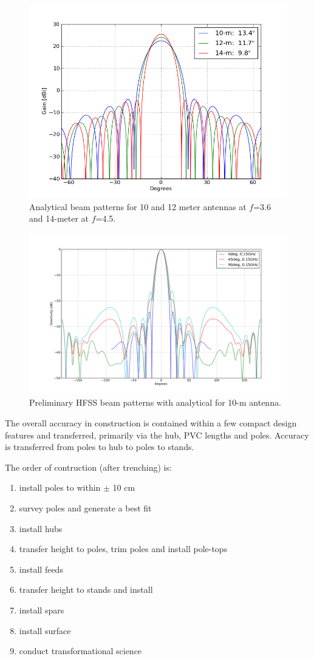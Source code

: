\documentclass[11pt]{article}
\begin{document}
\begin{figure}[H]
\centering
\includegraphics[width=12cm]{hera_10-12-14Beam.png}
\caption{Analytical beam patterns for 10 and 12 meter antennas at $f$=3.6 and 14-meter at $f$=4.5.}
\label{fig:HERA_10-12Beam}
\end{figure}

\begin{figure}[H]
\centering
\includegraphics[width=12cm]{pp.png}
\caption{Preliminary HFSS beam patterns with analytical for 10-m antenna.}
\label{fig:pp}
\end{figure}

The overall accuracy in construction is contained within a few compact design features and transferred, primarily via the hub, PVC lengths and poles.  Accuracy is transferred from poles to hub to poles to stands.

The order of contruction (after trenching) is:
\begin{enumerate}
\item install poles to within $\pm$ 10 cm
\item survey poles and generate a best fit
\item install hubs
\item transfer height to poles, trim poles and install pole-tops
\item install feeds
\item transfer height to stands and install
\item install spars
\item install surface
\item conduct transformational science
\end{enumerate}
\end{document}
